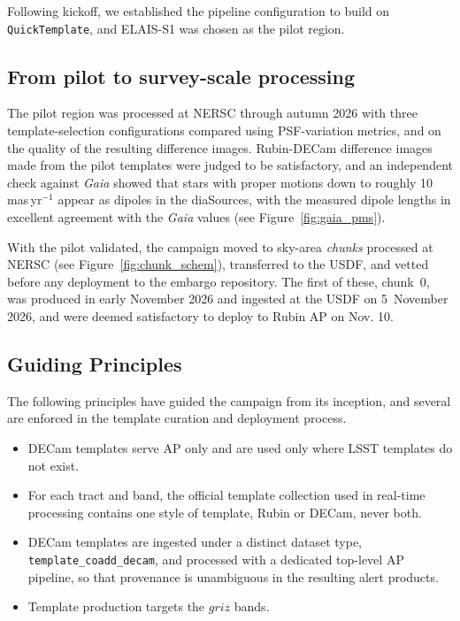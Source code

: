 Following kickoff, we established the pipeline configuration to build on \texttt{QuickTemplate}, and ELAIS-S1 was chosen as the pilot region. 
 
\subsection{From pilot to survey-scale processing}
 
The pilot region was processed at NERSC through autumn 2026 with three template-selection configurations compared using PSF-variation metrics, and on the quality of the resulting difference images. Rubin-DECam difference images made from the pilot templates were judged to be satisfactory, and an independent check against \textit{Gaia} showed that stars with proper motions down to roughly 10\,mas\,yr$^{-1}$ appear as dipoles in the diaSources, with the measured dipole lengths in excellent agreement with the \textit{Gaia} values (see Figure~\ref{fig:gaia_pms}).

With the pilot validated, the campaign moved to sky-area \textit{chunks} processed at NERSC (see Figure~\ref{fig:chunk_schem}), transferred to the USDF, and vetted before any deployment to the embargo repository. The first of these, chunk~0, was produced in early November 2026 and ingested at the USDF on 5~November 2026, and were deemed satisfactory to deploy to Rubin AP on Nov. 10. %

 
\subsection{Guiding Principles}
 
The following principles have guided the campaign from its inception, and several are enforced in the template curation and deployment process.
\begin{itemize}
  \item DECam templates serve AP only and are used only where LSST templates do not exist.
  \item For each tract and band, the official template collection used in real-time processing contains one style of template, Rubin or DECam, never both.
  \item DECam templates are ingested under a distinct dataset type, \texttt{template\_coadd\_decam}, and processed with a dedicated top-level AP pipeline, so that provenance is unambiguous in the resulting alert products.
  \item Template production targets the $griz$ bands.
\end{itemize}